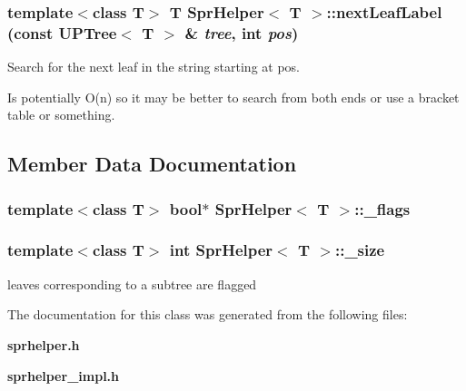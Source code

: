 \subsubsection{\setlength{\rightskip}{0pt plus 5cm}template$<$class T$>$ T {\bf Spr\-Helper}$<$ T $>$::next\-Leaf\-Label (const {\bf UPTree}$<$ T $>$ \& {\em tree}, int {\em pos})\hspace{0.3cm}{\tt  [static]}}\label{classSprHelper_e0}


Search for the next leaf in the string starting at pos. 

Is potentially O(n) so it may be better to search from both ends or use a bracket table or something. 

\subsection{Member Data Documentation}
\subsubsection{\setlength{\rightskip}{0pt plus 5cm}template$<$class T$>$ bool$\ast$ {\bf Spr\-Helper}$<$ T $>$::{\bf \_\-flags}\hspace{0.3cm}{\tt  [protected]}}\label{classSprHelper_p0}


\subsubsection{\setlength{\rightskip}{0pt plus 5cm}template$<$class T$>$ int {\bf Spr\-Helper}$<$ T $>$::{\bf \_\-size}\hspace{0.3cm}{\tt  [protected]}}\label{classSprHelper_p1}


leaves corresponding to a subtree are flagged 



The documentation for this class was generated from the following files:\begin{CompactItemize}
\item 
{\bf sprhelper.h}\item 
{\bf sprhelper\_\-impl.h}\end{CompactItemize}
